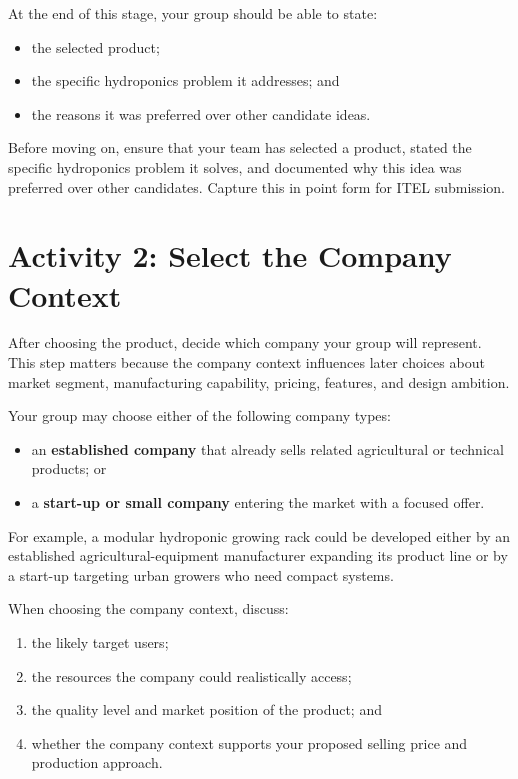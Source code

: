 At the end of this stage, your group should be able to state:
\begin{itemize}
    \item the selected product;
    \item the specific hydroponics problem it addresses; and
    \item the reasons it was preferred over other candidate ideas.
\end{itemize}

\begin{tcolorbox}[title=Checkpoint]
Before moving on, ensure that your team has selected a product, stated the specific hydroponics problem it solves, and documented why this idea was preferred over other candidates. Capture this in point form for ITEL submission.
\end{tcolorbox}

\section{Activity 2: Select the Company Context}

After choosing the product, decide which company your group will represent. This step matters because the company context influences later choices about market segment, manufacturing capability, pricing, features, and design ambition.

Your group may choose either of the following company types:
\begin{itemize}
    \item an \textbf{established company} that already sells related agricultural or technical products; or
    \item a \textbf{start-up or small company} entering the market with a focused offer.
\end{itemize}

For example, a modular hydroponic growing rack could be developed either by an established agricultural-equipment manufacturer expanding its product line or by a start-up targeting urban growers who need compact systems.

When choosing the company context, discuss:
\begin{enumerate}
    \item the likely target users;
    \item the resources the company could realistically access;
    \item the quality level and market position of the product; and
    \item whether the company context supports your proposed selling price and production approach.
\end{enumerate}

